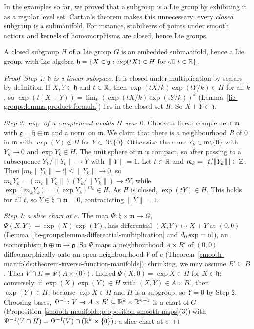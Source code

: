 In the examples so far, we proved that a subgroup is a Lie group by exhibiting it as a regular level set. Cartan's theorem makes this unnecessary: every
\emph{closed} subgroup is a submanifold. For instance, stabilisers of points under smooth actions and kernels of homomorphisms are closed, hence Lie groups.

\begin{theorem}[Cartan]\label{lie-groups:theorem-closed-subgroup}
A closed subgroup $H$ of a Lie group $G$ is an embedded submanifold, hence a Lie group, with Lie algebra
$\mathfrak{h} = \{X \in \mathfrak{g} : \exp(tX) \in H \text{ for all } t \in \mathbb{R}\}$.
\end{theorem}

\begin{proof}
\emph{Step 1: $\mathfrak{h}$ is a linear subspace.} It is closed under multiplication by scalars by definition. If $X, Y \in \mathfrak{h}$ and $t \in \mathbb{R}$, then
$\exp(tX/k)\exp(tY/k) \in H$ for all $k$, so $\exp(t(X + Y)) = \lim_k(\exp(tX/k)\exp(tY/k))^k$ (Lemma~\ref{lie-groups:lemma-product-formula}) lies in the closed
set $H$. So $X + Y \in \mathfrak{h}$.

\emph{Step 2: $\exp$ of a complement avoids $H$ near $0$.} Choose a linear complement $\mathfrak{m}$ with $\mathfrak{g} = \mathfrak{h} \oplus \mathfrak{m}$
and a norm on $\mathfrak{m}$. We claim that there is a neighbourhood $B$ of $0$ in $\mathfrak{m}$ with $\exp(Y) \notin H$ for $Y \in B \setminus \{0\}$.
Otherwise there are $Y_k \in \mathfrak{m} \setminus \{0\}$ with $Y_k \to 0$ and $\exp Y_k \in H$. The unit sphere of $\mathfrak{m}$ is compact, so after
passing to a subsequence $Y_k/\|Y_k\| \to Y$ with $\|Y\| = 1$. Let $t \in \mathbb{R}$ and $m_k = \lfloor t/\|Y_k\|\rfloor \in \mathbb{Z}$. Then
$|m_k\|Y_k\| - t| \leq \|Y_k\| \to 0$, so $m_kY_k = (m_k\|Y_k\|)(Y_k/\|Y_k\|) \to tY$, while $\exp(m_kY_k) = (\exp Y_k)^{m_k} \in H$. As $H$ is closed,
$\exp(tY) \in H$. This holds for all $t$, so $Y \in \mathfrak{h} \cap \mathfrak{m} = 0$, contradicting $\|Y\| = 1$.

\emph{Step 3: a slice chart at $e$.} The map $\Psi \colon \mathfrak{h} \times \mathfrak{m} \to G$, $\Psi(X, Y) = \exp(X)\exp(Y)$, has differential
$(X, Y) \mapsto X + Y$ at $(0, 0)$ (Lemma~\ref{lie-groups:lemma-differential-multiplication} and $d_0\exp = \mathrm{id}$), an isomorphism
$\mathfrak{h} \oplus \mathfrak{m} \to \mathfrak{g}$. So $\Psi$ maps a neighbourhood $A \times B'$ of $(0, 0)$ diffeomorphically onto an open neighbourhood $V$
of $e$ (Theorem~\ref{smooth-manifolds:theorem-inverse-function-manifolds}); shrinking, we may assume $B' \subseteq B$. Then $V \cap H = \Psi(A \times \{0\})$.
Indeed $\Psi(X, 0) = \exp X \in H$ for $X \in \mathfrak{h}$; conversely, if $\exp(X)\exp(Y) \in H$ with $(X, Y) \in A \times B'$, then $\exp(Y) \in H$, because
$\exp X \in H$ and $H$ is a subgroup, so $Y = 0$ by Step 2. Choosing bases, $\Psi^{-1} \colon V \to A \times B' \subseteq \mathbb{R}^k \times \mathbb{R}^{n-k}$ is a chart of
$G$ (Proposition~\ref{smooth-manifolds:proposition-smooth-maps}(3)) with $\Psi^{-1}(V \cap H) = \Psi^{-1}(V) \cap (\mathbb{R}^k \times \{0\})$: a slice chart at $e$.


\end{proof}
